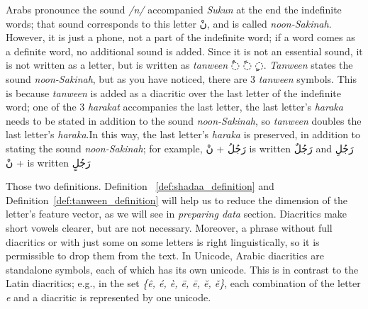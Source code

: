 Arabs pronounce the sound \textit{/n/} accompanied \textit{Sukun} at the end the indefinite words; that sound corresponds to this letter \textarabic{نْ}, and is called \textit{noon-Sakinah}. However, it is just a phone, not a part of the indefinite word; if a word comes as a definite word, no additional sound is added. Since it is not an essential sound, it is not written as a letter, but is written as \textit{tanween} \textarabic{◌ٌ ◌ً ◌ٍ}. \textit{Tanween} states the sound \textit{noon-Sakinah}, but as you have noticed, there are 3 \textit{tanween} symbols. This is because  \textit{tanween} is added as a diacritic over the last letter of the indefinite word; one of the 3 \textit{harakat} accompanies the last letter, the last letter's \textit{haraka} needs to be stated in addition to the sound \textit{noon-Sakinah}, so \textit{tanween} doubles the last letter's \textit{haraka}.In this way, the last letter's \textit{haraka} is preserved, in addition to stating the sound \textit{noon-Sakinah}; for example, \textarabic{رَجُلُ + نْ} is written
\textarabic{رَجُلٌ} and  \textarabic{رَجُلِ + نْ} is written \textarabic{رَجُلٍ}

Those two definitions. Definition ~\ref{def:shadaa_definition} and
Definition~\ref{def:tanween_definition} will help us to reduce the dimension of the letter’s feature vector, as we will see in \textit{preparing data} section. Diacritics make short vowels clearer, but are not necessary. Moreover, a phrase without full diacritics or with just some on some letters is right linguistically, so it is permissible to drop them from the text. In Unicode, Arabic diacritics are standalone symbols, each of which has its own unicode. This is in contrast to the Latin diacritics; e.g., in the set \textit{\{ê, é, è, ë, ē, ĕ,
  ě\}}, each combination of the letter \textit{e} and a diacritic is represented by one unicode.


